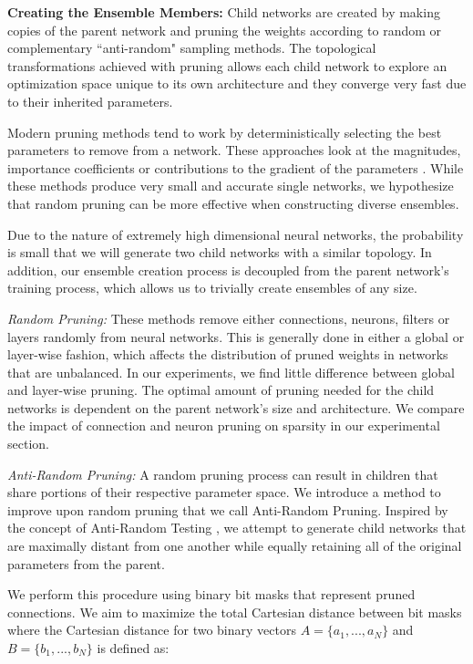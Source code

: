 \documentclass[letterpaper]{article} %
\begin{document}
\textbf{Creating the Ensemble Members:} Child networks are created by making copies of the parent network and pruning the weights according to random or complementary ``anti-random" sampling methods.
The topological transformations achieved with pruning allows each child network to explore an optimization space unique to its own architecture and they converge very fast due to their inherited parameters.

Modern pruning methods tend to work by deterministically selecting the best parameters to remove from a network. These approaches look at the magnitudes, importance coefficients or contributions to the gradient of the parameters \cite{blalock2020state, janowski1989pruning, lecun1990optimal, lee2019snip, frankle2019lottery}. While these methods produce very small and accurate single networks, we hypothesize that random pruning can be more effective when constructing diverse ensembles.

Due to the nature of extremely high dimensional neural networks, the probability is small that we will generate two child networks with a similar topology. In addition, our ensemble creation process is decoupled from the parent network's training process, which allows us to trivially create ensembles of any size.

\textit{Random Pruning:} These methods remove either connections, neurons, filters or layers randomly from neural networks. This is generally done in either a global or layer-wise fashion, which affects the distribution of pruned weights in networks that are unbalanced. In our experiments, we find little difference between global and layer-wise pruning. The optimal amount of pruning needed for the child networks is dependent on the parent network's size and architecture. We compare the impact of connection and neuron pruning on sparsity in our experimental section.

\textit{Anti-Random Pruning:}  A random pruning process can result in children that share portions of their respective parameter space. We introduce a method to improve upon random pruning that we call Anti-Random Pruning. Inspired by the concept of Anti-Random Testing \cite{malaiya1995antirandom}, we attempt to generate child networks that are maximally distant from one another while equally retaining all of the original parameters from the parent.

We perform this procedure using binary bit masks that represent pruned connections. We aim to maximize the total
Cartesian distance between bit masks where the Cartesian distance for two binary vectors $A = \{a_1, ..., a_N\}$ and $B = \{b_1, ..., b_N\}$ is defined as:
\end{document}
